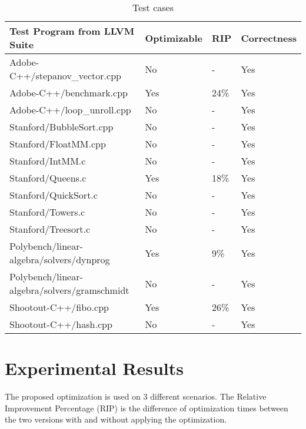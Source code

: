 \begin{table}[]
	\centering
	\caption{Test cases}
	\label{llvmtest}
	\begin{tabular}{p{6cm}l l l }
		\toprule
		\textbf{Test Program from LLVM Suite}        & \textbf{Optimizable}  & \textbf{RIP} & \textbf{Correctness} \\ \midrule
		Adobe-C++/stepanov\_vector.cpp               & No    & -                & Yes                  \\ \midrule
		Adobe-C++/benchmark.cpp                      & Yes & 24\% & Yes                  \\ \midrule
		Adobe-C++/loop\_unroll.cpp                   & No & -                   & Yes                  \\ \midrule
		Stanford/BubbleSort.cpp                      & No & -                   & Yes                  \\ \midrule
		Stanford/FloatMM.cpp                         & No & -                   & Yes                  \\ \midrule
		Stanford/IntMM.c                             & No & -                   & Yes                  \\ \midrule
		Stanford/Queens.c                            & Yes & 18\% & Yes                  \\ \midrule
		Stanford/QuickSort.c                         & No  & -                  & Yes                  \\ \midrule
		Stanford/Towers.c                            & No  & -                   & Yes                  \\ \midrule
		Stanford/Treesort.c                          & No & -                   & Yes                  \\ \midrule
		Polybench/linear-algebra/solvers/dynprog     & Yes & 9\%  & Yes                  \\ \midrule
		Polybench/linear-algebra/solvers/gramschmidt & No  & -                  & Yes                  \\ \midrule
		Shootout-C++/fibo.cpp                        & Yes & 26\% & Yes                  \\ \midrule
		Shootout-C++/hash.cpp                        & No  & -                   & Yes                  \\ \bottomrule
	\end{tabular}
\end{table}

\pagebreak
\section{Experimental Results}
The proposed optimization is used on 3 different scenarios. The Relative Improvement Percentage (RIP) is the difference of optimization times between the two versions with and without applying the optimization.

